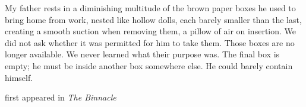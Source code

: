 
My father rests in a diminishing multitude of the brown paper boxes he
used to bring home from work, nested like hollow dolls, each barely
smaller than the last, creating a smooth suction when removing them, a
pillow of air on insertion. We did not ask whether it was permitted for
him to take them. Those boxes are no longer available. We never learned
what their purpose was. The final box is empty; he must be inside
another box somewhere else. He could barely contain himself.

first appeared in \emph{The Binnacle}
